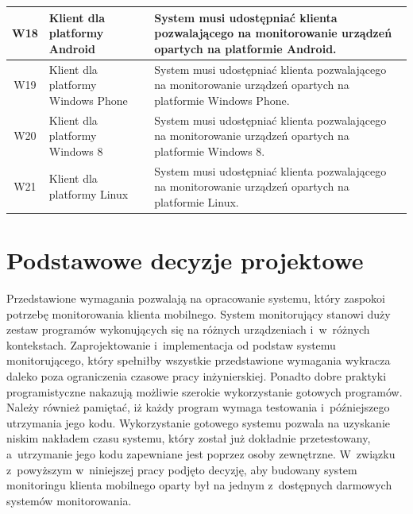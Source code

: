 \begin{longtable}[c]{|c||p{3.5cm}|p{9cm}|}
  W18 & \raggedright{Klient dla platformy Android} & \raggedright{System musi udostępniać klienta pozwalającego na monitorowanie urządzeń opartych na platformie Android.} \tabularnewline
  \hline

  W19 & \raggedright{Klient dla platformy Windows Phone} & \raggedright{System musi udostępniać klienta pozwalającego na monitorowanie urządzeń opartych na platformie Windows Phone.} \tabularnewline 
  \hline

  W20 & \raggedright{Klient dla platformy Windows 8} & \raggedright{System musi udostępniać klienta pozwalającego na monitorowanie urządzeń opartych na platformie Windows 8.} \tabularnewline
  \hline

  W21 & \raggedright{Klient dla platformy Linux} & \raggedright{System musi udostępniać klienta pozwalającego na monitorowanie urządzeń opartych na platformie Linux.} \tabularnewline
  \hline
\end{longtable}

\section[Decyzje projektowe][Podstawowe decyzje projektowe]{Podstawowe decyzje projektowe}

Przedstawione wymagania pozwalają na opracowanie systemu, który
zaspokoi potrzebę monitorowania klienta mobilnego. System monitorujący
stanowi duży zestaw programów wykonujących się na różnych urządzeniach
i~w~różnych kontekstach. Zaprojektowanie i~implementacja od podstaw
systemu monitorującego, który spełniłby wszystkie przedstawione
wymagania wykracza daleko poza ograniczenia czasowe pracy
inżynierskiej. Ponadto dobre praktyki programistyczne nakazują
możliwie szerokie wykorzystanie gotowych programów. Należy również
pamiętać, iż każdy program wymaga testowania i~późniejszego utrzymania
jego kodu. Wykorzystanie gotowego systemu pozwala na uzyskanie niskim
nakładem czasu systemu, który został już dokładnie przetestowany,
a~utrzymanie jego kodu zapewniane jest poprzez osoby zewnętrzne.
W~związku z~powyższym w~niniejszej pracy podjęto decyzję, aby budowany
system monitoringu klienta mobilnego oparty był na jednym z~dostępnych
darmowych systemów monitorowania. 

